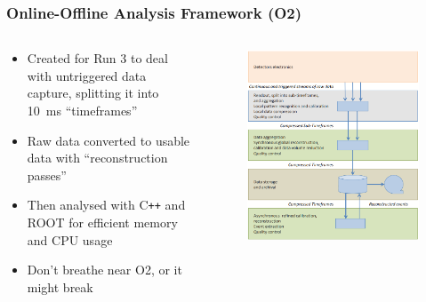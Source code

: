 \documentclass[11pt]{beamer}
\begin{document}
\begin{frame}
    \frametitle{Online-Offline Analysis Framework (O2)}

    \begin{columns}[c]
        \begin{column}{0.5\textwidth}
            \begin{itemize}
                \item Created for Run 3 to deal with untriggered data capture, splitting it into \SI{10}{\milli\second} ``timeframes''
                \item Raw data converted to usable data with ``reconstruction passes''
                \item Then analysed with C\texttt{++} and ROOT for efficient memory and CPU usage
                \item Don't breathe near O2, or it might break
            \end{itemize}
        \end{column}

        \begin{column}{0.5\textwidth}
            \begin{figure}
                \begin{center}
                    \includegraphics[width=\textwidth]{Figs/O2_flow.png}
                \end{center}
            \end{figure}
        \end{column}
    \end{columns}

\end{frame}
\end{document}

